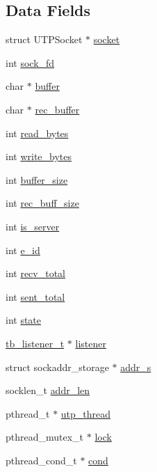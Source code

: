 \subsection*{Data Fields}
\begin{DoxyCompactItemize}
\item 
struct U\-T\-P\-Socket $\ast$ \hyperlink{structtb__utp__wrapper__t_add15e39a83c7a0c72140c305bdd386d0}{socket}
\item 
int \hyperlink{structtb__utp__wrapper__t_a514331e6141a28289f8ddead55eadebd}{sock\-\_\-fd}
\item 
char $\ast$ \hyperlink{structtb__utp__wrapper__t_aff2566f4c366b48d73479bef43ee4d2e}{buffer}
\item 
char $\ast$ \hyperlink{structtb__utp__wrapper__t_a2e6fac18f9532108c2aa44a52d3c6d67}{rec\-\_\-buffer}
\item 
int \hyperlink{structtb__utp__wrapper__t_aeb56438a9cac1febce2dcddd6c404759}{read\-\_\-bytes}
\item 
int \hyperlink{structtb__utp__wrapper__t_a814ec097a6a396e10f9f0924e924684e}{write\-\_\-bytes}
\item 
int \hyperlink{structtb__utp__wrapper__t_af22ff4ab7a026e6c3b4b08eafb2df027}{buffer\-\_\-size}
\item 
int \hyperlink{structtb__utp__wrapper__t_a57c1edf513c216e498e37e3428180480}{rec\-\_\-buff\-\_\-size}
\item 
int \hyperlink{structtb__utp__wrapper__t_a16d6097ae8087fb54d727dbee6e315c9}{is\-\_\-server}
\item 
int \hyperlink{structtb__utp__wrapper__t_ae2ab59af76be940892170990721a0832}{e\-\_\-id}
\item 
int \hyperlink{structtb__utp__wrapper__t_abf192d5591e28d37f0795a6c730a9a5b}{recv\-\_\-total}
\item 
int \hyperlink{structtb__utp__wrapper__t_a8cb5bfce3dd82afd8155aae9c7328441}{sent\-\_\-total}
\item 
int \hyperlink{structtb__utp__wrapper__t_a89f234133d3efe315836311cbf21c64b}{state}
\item 
\hyperlink{structtb__listener__t}{tb\-\_\-listener\-\_\-t} $\ast$ \hyperlink{structtb__utp__wrapper__t_a0c02803e7ead869ea25f956fb4619873}{listener}
\item 
struct sockaddr\-\_\-storage $\ast$ \hyperlink{structtb__utp__wrapper__t_a6c6b934648a67540d62892076f229e35}{addr\-\_\-s}
\item 
socklen\-\_\-t \hyperlink{structtb__utp__wrapper__t_a116941d922ae354d7241d04b0f3c84d8}{addr\-\_\-len}
\item 
pthread\-\_\-t $\ast$ \hyperlink{structtb__utp__wrapper__t_aa0eb12bac5ef0d83e6689f3b547b695d}{utp\-\_\-thread}
\item 
pthread\-\_\-mutex\-\_\-t $\ast$ \hyperlink{structtb__utp__wrapper__t_a33586b4184d23f2b8f4df153ec23af13}{lock}
\item 
pthread\-\_\-cond\-\_\-t $\ast$ \hyperlink{structtb__utp__wrapper__t_a41d4de1455ed50839baec9be13941163}{cond}
\end{DoxyCompactItemize}


